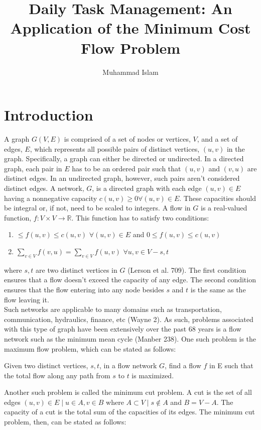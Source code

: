 \documentclass[11pt]{article}
\title{Daily Task Management: An Application of the Minimum Cost Flow Problem}
\author{Muhammad Islam}
\begin{document}
\maketitle
\section{Introduction}
A graph $G(V,E)$ is comprised of a set of nodes or vertices, $V$, and a set of edges, $E$, which represents all possible pairs of distinct vertices, $(u, v)$ in the graph. Specifically, a graph can either be directed or undirected. In a directed graph, each pair in $E$ has to be an ordered pair such that $(u,v)$ and $(v, u)$ are distinct edges. In an undirected graph, however, such pairs aren't considered distinct edges. A network, $G$, is a directed graph with each edge $(u, v) \in E$ having a nonnegative capacity $c(u, v) \geq 0 \forall (u, v) \in E$. These capacities should be integral or, if not, need to be scaled to integers. A flow in $G$ is a real-valued function, $f: V \times V \rightarrow \mathbb{R}$. This function has to satisfy two conditions:
\begin{enumerate}
\item $\leq f(u, v) \leq c(u,v)$  $\forall (u, v) \in E$ and $0 \leq f(u, v) \leq c(u,v)$  
\item $\sum_{v \in V} f(v, u) = \sum_{v \in V} f(u, v)$ $\forall u, v \in V - {s, t}$
\end{enumerate}
where $s, t$ are two distinct vertices in $G$ (Lerson et al. 709). The first condition ensures that a flow doesn't exceed the capacity of any edge. The second condition ensures that the flow entering into any node besides $s$ and $t$ is the same as the flow leaving it. \\
Such networks are applicable to many domains such as transportation, communication, hydraulics, finance, etc (Wayne 2). As such, problems associated with this type of graph have been extensively over the past 68 years is a flow network such as the minimum mean cycle  (Manber 238). One such problem is the maximum flow problem, which can be stated as follows:
\begin{tcolorbox}
	Given two distinct vertices, $s, t$, in a flow network $G$, find a flow $f$ in E such that the total flow along any path from $s$ to $t$ is maximized.  
\end{tcolorbox}
Another such problem is called the minimum cut problem. A cut is the set of all edges $(u, v) \in E \mid u \in A, v \in B$ where $A \subset V \mid s \not\in A$ and $B = V - A$. The capacity of a cut is the total sum of the capacities of its edges. The minimum cut problem, then, can be stated as follows:
\end{document}
